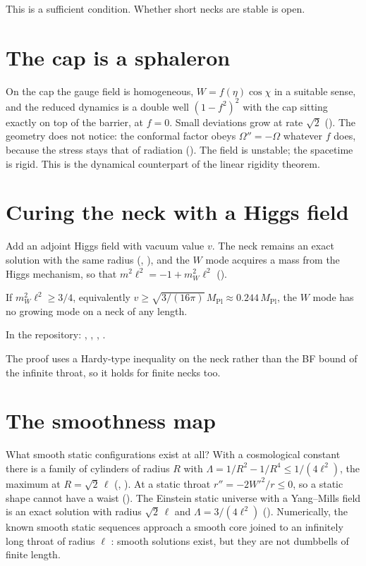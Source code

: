 This is a sufficient condition. Whether short necks are stable is open. \open

\section{The cap is a sphaleron}

On the cap the gauge field is homogeneous, $W=f(\eta)\cos\chi$ in a suitable sense, and the reduced dynamics is a double well $(1-f^2)^2$ with the cap sitting exactly on top of the barrier, at $f=0$. Small deviations grow at rate $\sqrt2$ (). The geometry does not notice: the conformal factor obeys $\Omega''=-\Omega$ whatever $f$ does, because the stress stays that of radiation (). The field is unstable; the spacetime is rigid. This is the dynamical counterpart of the linear rigidity theorem.

\section{Curing the neck with a Higgs field}

Add an adjoint Higgs field with vacuum value $v$. The neck remains an exact solution with the same radius (, ), and the $W$ mode acquires a mass from the Higgs mechanism, so that $m^2\ell^2=-1+m_W^2\ell^2$ ().

\begin{theorem}\proved\label{thm:higgsneck}
If $m_W^2\ell^2\ge3/4$, equivalently $v\ge\sqrt{3/(16\pi)}\,M_{\mathrm{Pl}}\approx0.244\,M_{\mathrm{Pl}}$, the $W$ mode has no growing mode on a neck of any length.
\end{theorem}
\noindent In the repository: , , , .

The proof uses a Hardy-type inequality on the neck rather than the BF bound of the infinite throat, so it holds for finite necks too.

\section{The smoothness map}

What smooth static configurations exist at all? With a cosmological constant there is a family of cylinders of radius $R$ with $\Lambda=1/R^2-1/R^4\le1/(4\ell^2)$, the maximum at $R=\sqrt2\,\ell$ (, ). At a static throat $r''=-2W'^2/r\le0$, so a static shape cannot have a waist (). The Einstein static universe with a Yang--Mills field is an exact solution with radius $\sqrt2\,\ell$ and $\Lambda=3/(4\ell^2)$ (). Numerically, the known smooth static sequences approach a smooth core joined to an infinitely long throat of radius $\ell$ \numerical: smooth solutions exist, but they are not dumbbells of finite length.

